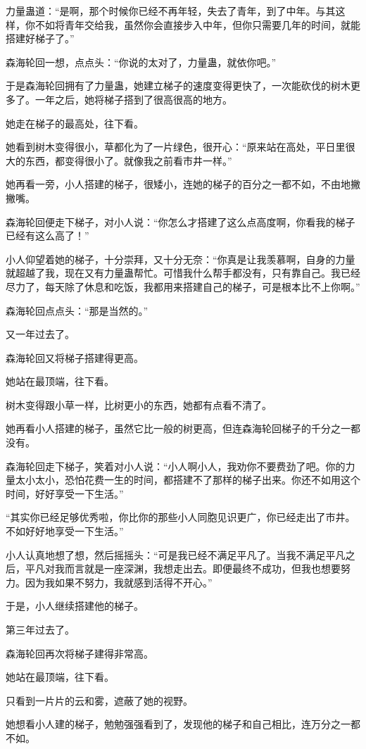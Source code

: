 \begin{this_body}
力量蛊道：“是啊，那个时候你已经不再年轻，失去了青年，到了中年。与其这样，你不如将青年交给我，虽然你会直接步入中年，但你只需要几年的时间，就能搭建好梯子了。”

森海轮回一想，点点头：“你说的太对了，力量蛊，就依你吧。”

于是森海轮回拥有了力量蛊，她建立梯子的速度变得更快了，一次能砍伐的树木更多了。一年之后，她将梯子搭到了很高很高的地方。

她走在梯子的最高处，往下看。

她看到树木变得很小，草都化为了一片绿色，很开心：“原来站在高处，平日里很大的东西，都变得很小了。就像我之前看市井一样。”

她再看一旁，小人搭建的梯子，很矮小，连她的梯子的百分之一都不如，不由地撇撇嘴。

森海轮回便走下梯子，对小人说：“你怎么才搭建了这么点高度啊，你看我的梯子已经有这么高了！”

小人仰望着她的梯子，十分崇拜，又十分无奈：“你真是让我羡慕啊，自身的力量就超越了我，现在又有力量蛊帮忙。可惜我什么帮手都没有，只有靠自己。我已经尽力了，每天除了休息和吃饭，我都用来搭建自己的梯子，可是根本比不上你啊。”

森海轮回点点头：“那是当然的。”

又一年过去了。

森海轮回又将梯子搭建得更高。

她站在最顶端，往下看。

树木变得跟小草一样，比树更小的东西，她都有点看不清了。

她再看小人搭建的梯子，虽然它比一般的树更高，但连森海轮回梯子的千分之一都没有。

森海轮回走下梯子，笑着对小人说：“小人啊小人，我劝你不要费劲了吧。你的力量太小太小，恐怕花费一生的时间，都搭建不了那样的梯子出来。你还不如用这个时间，好好享受一下生活。”

“其实你已经足够优秀啦，你比你的那些小人同胞见识更广，你已经走出了市井。不如好好地享受一下生活。”

小人认真地想了想，然后摇摇头：“可是我已经不满足平凡了。当我不满足平凡之后，平凡对我而言就是一座深渊，我想走出去。即便最终不成功，但我也想要努力。因为我如果不努力，我就感到活得不开心。”

于是，小人继续搭建他的梯子。

第三年过去了。

森海轮回再次将梯子建得非常高。

她站在最顶端，往下看。

只看到一片片的云和雾，遮蔽了她的视野。

她想看小人建的梯子，勉勉强强看到了，发现他的梯子和自己相比，连万分之一都不如。


\end{this_body}
